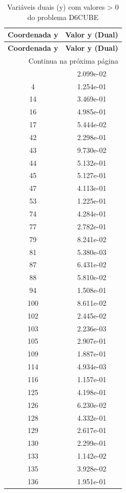 \documentclass[12pt]{article}
\begin{document}
\begin{longtable}{@{}cc@{}}
\caption{Variáveis duais (y) com valores > 0 do problema D6CUBE} \\
\toprule
\textbf{Coordenada y} & \textbf{Valor y (Dual)} \\
\midrule
\endfirsthead

\toprule
\textbf{Coordenada y} & \textbf{Valor y (Dual)} \\
\midrule
\endhead

\midrule \multicolumn{2}{r}{{Continua na próxima página}} \\ \midrule
\endfoot

\bottomrule
\endlastfoot
2 & 2.099e-02 \\
4 & 1.254e-01 \\
14 & 3.469e-01 \\
16 & 4.985e-01 \\
17 & 5.444e-02 \\
42 & 2.298e-01 \\
43 & 9.730e-02 \\
44 & 5.132e-01 \\
45 & 5.127e-01 \\
47 & 4.113e-01 \\
53 & 1.225e-01 \\
74 & 4.284e-01 \\
77 & 2.782e-01 \\
79 & 8.241e-02 \\
81 & 5.380e-03 \\
87 & 6.431e-02 \\
88 & 5.810e-02 \\
94 & 1.508e-01 \\
100 & 8.611e-02 \\
102 & 2.445e-02 \\
103 & 2.236e-03 \\
105 & 2.907e-01 \\
109 & 1.887e-01 \\
114 & 4.934e-03 \\
116 & 1.157e-01 \\
125 & 4.198e-01 \\
126 & 6.230e-02 \\
128 & 4.332e-01 \\
129 & 2.617e-01 \\
130 & 2.299e-01 \\
133 & 1.142e-02 \\
135 & 3.928e-02 \\
136 & 1.951e-01 \\

\end{longtable}
\end{document}
